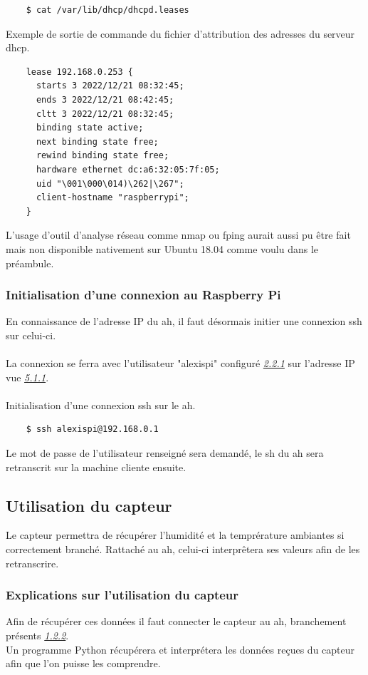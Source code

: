\documentclass[a4paper]{article}
\begin{document}
\begin{lstlisting}
    $ cat /var/lib/dhcp/dhcpd.leases
\end{lstlisting}
Exemple de sortie de commande du fichier d'attribution des adresses du serveur \gls{dhcp}.
\begin{lstlisting}
    lease 192.168.0.253 {
      starts 3 2022/12/21 08:32:45;
      ends 3 2022/12/21 08:42:45;
      cltt 3 2022/12/21 08:32:45;
      binding state active;
      next binding state free;
      rewind binding state free;
      hardware ethernet dc:a6:32:05:7f:05;
      uid "\001\000\014)\262|\267";
      client-hostname "raspberrypi";
    }
\end{lstlisting}
L'usage d'outil d'analyse réseau comme nmap ou fping aurait aussi pu être fait mais non disponible nativement sur Ubuntu 18.04 comme voulu dans le préambule.
\subsubsection{Initialisation d'une connexion au Raspberry Pi}
En connaissance de l'adresse IP du \acrshort{ah}, il faut désormais initier une connexion \gls{ssh} sur celui-ci.\\\\La connexion se ferra avec l'utilisateur "alexispi" configuré \hyperref[sec:sec03]{\textit{2.2.1}} sur l'adresse IP vue \hyperref[sec:iprpi]{\textit{5.1.1}}.\\\\Initialisation d'une connexion \gls{ssh} sur le \acrshort{ah}.
\begin{lstlisting}
    $ ssh alexispi@192.168.0.1
\end{lstlisting}
Le mot de passe de l'utilisateur renseigné sera demandé, le \gls{sh} du \acrshort{ah} sera retranscrit sur la machine cliente ensuite. 
\subsection{Utilisation du capteur}
Le capteur permettra de récupérer l'humidité et la temprérature ambiantes si correctement branché. Rattaché au \acrshort{ah}, celui-ci interprêtera ses valeurs afin de les retranscrire.
\subsubsection{Explications sur l'utilisation du capteur}
Afin de récupérer ces données il faut connecter le capteur au \acrshort{ah}, branchement présents \hyperref[sec:branchementcapteur]{\textit{1.2.2}}.\\Un programme Python récupérera et interprétera les données reçues du capteur afin que l'on puisse les comprendre.
\end{document}
